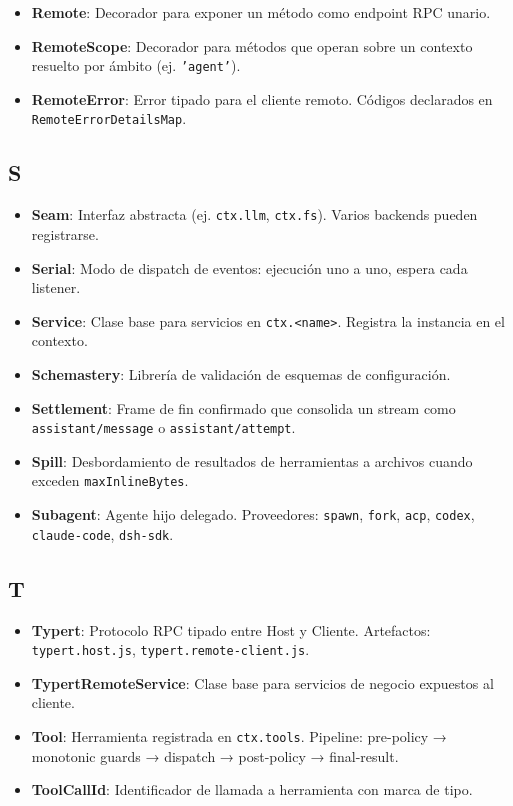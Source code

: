 \documentclass[11pt,a4paper]{article}
\begin{document}
\begin{itemize}[leftmargin=*,topsep=2pt,itemsep=1pt]
  \item \textbf{Remote}: Decorador para exponer un método como endpoint RPC unario.
  \item \textbf{RemoteScope}: Decorador para métodos que operan sobre un contexto resuelto por ámbito (ej. \texttt{'agent'}).
  \item \textbf{RemoteError}: Error tipado para el cliente remoto. Códigos declarados en \texttt{RemoteErrorDetailsMap}.
\end{itemize}


\subsection*{S}


\begin{itemize}[leftmargin=*,topsep=2pt,itemsep=1pt]
  \item \textbf{Seam}: Interfaz abstracta (ej. \texttt{ctx.llm}, \texttt{ctx.fs}). Varios backends pueden registrarse.
  \item \textbf{Serial}: Modo de dispatch de eventos: ejecución uno a uno, espera cada listener.
  \item \textbf{Service}: Clase base para servicios en \texttt{ctx.<name>}. Registra la instancia en el contexto.
  \item \textbf{Schemastery}: Librería de validación de esquemas de configuración.
  \item \textbf{Settlement}: Frame de fin confirmado que consolida un stream como \texttt{assistant/message} o \texttt{assistant/attempt}.
  \item \textbf{Spill}: Desbordamiento de resultados de herramientas a archivos cuando exceden \texttt{maxInlineBytes}.
  \item \textbf{Subagent}: Agente hijo delegado. Proveedores: \texttt{spawn}, \texttt{fork}, \texttt{acp}, \texttt{codex}, \texttt{claude-code}, \texttt{dsh-sdk}.
\end{itemize}


\subsection*{T}


\begin{itemize}[leftmargin=*,topsep=2pt,itemsep=1pt]
  \item \textbf{Typert}: Protocolo RPC tipado entre Host y Cliente. Artefactos: \texttt{typert.host.js}, \texttt{typert.remote-client.js}.
  \item \textbf{TypertRemoteService}: Clase base para servicios de negocio expuestos al cliente.
  \item \textbf{Tool}: Herramienta registrada en \texttt{ctx.tools}. Pipeline: pre-policy → monotonic guards → dispatch → post-policy → final-result.
  \item \textbf{ToolCallId}: Identificador de llamada a herramienta con marca de tipo.
\end{itemize}
\end{document}
